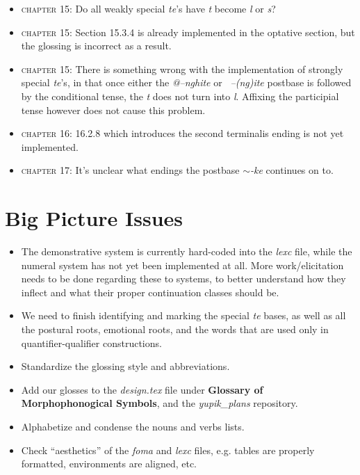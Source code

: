 \documentclass{article}
\begin{document}
\begin{itemize}
\item \textsc{chapter 15}: Do all weakly special \textit{te}'s have \textit{t} become \textit{l} or \textit{s}?

\item \textsc{chapter 15}: Section 15.3.4 is already implemented in the optative section, but the glossing is incorrect as a result.

\item \textsc{chapter 15}: There is something wrong with the implementation of strongly special \textit{te}'s, in that once either the \textit{@--nghite} or \textit{~--(ng)ite} postbase is followed by the conditional tense, the \textit{t} does not turn into \textit{l}.
%
Affixing the participial tense however does not cause this problem.

\item \textsc{chapter 16}: 16.2.8 which introduces the second terminalis ending is not yet implemented.

\item \textsc{chapter 17}: It's unclear what endings the postbase \textit{$\sim$-ke} continues on to.

\end{itemize}


\section{Big Picture Issues}

\begin{itemize}
\renewcommand\labelitemi{$\cdot$}

\item The demonstrative system is currently hard-coded into the \textit{lexc} file, while the numeral system has not yet been implemented at all.
%
More work/elicitation needs to be done regarding these to systems, to better understand how they inflect and what their proper continuation classes should be.

\item We need to finish identifying and marking the special \textit{te} bases, as well as all the postural roots, emotional roots, and the words that are used only in quantifier-qualifier constructions.

\item Standardize the glossing style and abbreviations.

\item Add our glosses to the \textit{design.tex} file under \textbf{Glossary of Morphophonogical Symbols}, and the \textit{yupik\_plans} repository.

\item Alphabetize and condense the nouns and verbs lists.

\item Check ``aesthetics'' of the \textit{foma} and \textit{lexc} files, e.g. tables are properly formatted, environments are aligned, etc.

\end{itemize}
\end{document}
